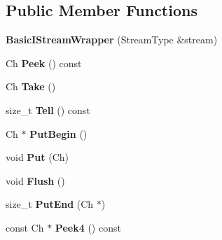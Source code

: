\subsection*{Public Member Functions}
\begin{DoxyCompactItemize}
\item 
{\bfseries Basic\+I\+Stream\+Wrapper} (Stream\+Type \&stream)\hypertarget{classBasicIStreamWrapper_a3e9a2dd2b6b28243f8f2a911f67cdf56}{}\label{classBasicIStreamWrapper_a3e9a2dd2b6b28243f8f2a911f67cdf56}

\item 
Ch {\bfseries Peek} () const \hypertarget{classBasicIStreamWrapper_ae0c3f22e0955034c3dc90c2398ff4742}{}\label{classBasicIStreamWrapper_ae0c3f22e0955034c3dc90c2398ff4742}

\item 
Ch {\bfseries Take} ()\hypertarget{classBasicIStreamWrapper_afb71f0329d0abbbc9b22ebeb5c1464d1}{}\label{classBasicIStreamWrapper_afb71f0329d0abbbc9b22ebeb5c1464d1}

\item 
size\+\_\+t {\bfseries Tell} () const \hypertarget{classBasicIStreamWrapper_a7da87efb1177bfaa131f33c0cb2873fc}{}\label{classBasicIStreamWrapper_a7da87efb1177bfaa131f33c0cb2873fc}

\item 
Ch $\ast$ {\bfseries Put\+Begin} ()\hypertarget{classBasicIStreamWrapper_a62a3fc10b009ea231fb9d2dc958c539c}{}\label{classBasicIStreamWrapper_a62a3fc10b009ea231fb9d2dc958c539c}

\item 
void {\bfseries Put} (Ch)\hypertarget{classBasicIStreamWrapper_afa71cb2f5b7668837d0a81e3bce55e69}{}\label{classBasicIStreamWrapper_afa71cb2f5b7668837d0a81e3bce55e69}

\item 
void {\bfseries Flush} ()\hypertarget{classBasicIStreamWrapper_a37d5e4cd8fdf3c83dad50737e95886a9}{}\label{classBasicIStreamWrapper_a37d5e4cd8fdf3c83dad50737e95886a9}

\item 
size\+\_\+t {\bfseries Put\+End} (Ch $\ast$)\hypertarget{classBasicIStreamWrapper_ab2ead53490207a1cb0bdd674a03957f3}{}\label{classBasicIStreamWrapper_ab2ead53490207a1cb0bdd674a03957f3}

\item 
const Ch $\ast$ {\bfseries Peek4} () const \hypertarget{classBasicIStreamWrapper_aaae0c7e7f2d06eb1638cce33ed664f31}{}\label{classBasicIStreamWrapper_aaae0c7e7f2d06eb1638cce33ed664f31}

\end{DoxyCompactItemize}



